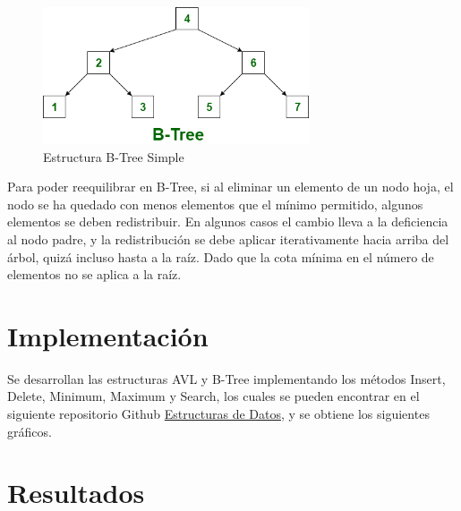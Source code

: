 \documentclass{article}
\begin{document}
\begin{enumerate}
\begin{figure}[H]
\centering
\includegraphics[width=0.7\textwidth]{Img/B-Tree.png}
\caption{Estructura B-Tree Simple}
\end{figure}

Para poder reequilibrar en B-Tree, si al eliminar un elemento de un nodo hoja, el nodo se ha quedado con menos elementos que el mínimo permitido, algunos elementos se deben redistribuir. En algunos casos el cambio lleva a la deficiencia al nodo padre, y la redistribución se debe aplicar iterativamente hacia arriba del árbol, quizá incluso hasta a la raíz. Dado que la cota mínima en el número de elementos no se aplica a la raíz. 
		 
\end{enumerate}


\section{Implementación}

  Se desarrollan las estructuras AVL y B-Tree implementando los métodos Insert, Delete, Minimum, Maximum y Search, los cuales se pueden encontrar en el siguiente repositorio Github \href{https://github.com/josuemzx/Implementacion_AVL_y_B-Tree}{Estructuras de Datos}, y se obtiene los siguientes gráficos.


\section{Resultados}
\end{document}
